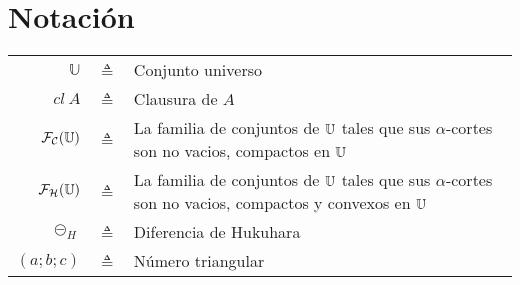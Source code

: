\chapter*{Notación}
\begin{table}[htbp]
	\centering %
	\begin{tabular}{r c p{10cm} }
		\toprule
		$\mathbb{U}$ & $\triangleq$ & Conjunto universo\\
		$cl~A$ &  $\triangleq$ & Clausura de $A$ \\
		$\mathcal{F}_\mathcal{C}(\mathbb U)$ & $\triangleq$ & La familia de conjuntos de $\mathbb U$ tales que sus $\alpha$-cortes son no vacios, compactos en $\mathbb U$ \\
		$\mathcal{F}_\mathcal{H}(\mathbb U)$ & $\triangleq$ & La familia de conjuntos de $\mathbb U$ tales que sus $\alpha$-cortes son no vacios, compactos y convexos en $\mathbb U$ \\
		$\circleddash_H $ & $\triangleq$ & Diferencia de Hukuhara \\
		$(a;b;c)$ & $\triangleq$ & Número triangular \\
		\bottomrule
	\end{tabular}
	\label{tab:notacion}
\end{table}